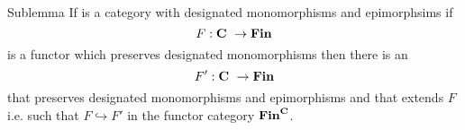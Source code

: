 \newcommand{\mappedrepresentationdiagram}{
\newcommand{\myspacing}{0.25cm}
$
\begin{array}{ c p{0.2cm} c p{0.5cm} c}
\Rnode{Imgf}{Img(D(f))} && \Rnode{b}{D(b)}   &&                   \\[\myspacing]
                        &&                   &&\Rnode{d1}{D(d_1)} \\[\myspacing]
                        &&\Rnode{b1}{D(b_1)} &&                   \\[\myspacing]
                        &&                   &&\Rnode{d2}{D(d_2)} \\[\myspacing]
                        &&\Rnode{b2}{D(b_2)} &&                   \\ %
                        &&\vdots             &&\vdots             \\
                        &&\Rnode{bnp}{d(b_{n-1})} &&           \\[\myspacing]
                        &&                   &&\Rnode{dn}{D(d_n)} \\[\myspacing]
\Rnode{c}{D(c)}  
\end{array}
\begin{arrows}
\ncline{H->}{Imgf}{b}
\ncarr{Imgf}{c}\alabel{H_D}
\ncarr[5]{b}{d1}\alabel{D(q_1)^{-1}}[0.5][-3]
\ncarr{d1}{b1}\blabel{D(h_1)}[0.5][-1]
\ncarr{b1}{d2}\alabel{D(q_2)^{-1}}[0.5][-3]
\ncarr{d2}{b2}\blabel{D(h_2)}[0.5][-1]
\ncarr{bnp}{dn}\alabel{D(q_n)^{-1}}[0.5][-3]
\ncarr[5]{dn}{c}\alabel{D(h_n)}[0.5][-1]
\end{arrows}
$
}

\begin{frame}{Sublemma}
If \catcw is a category with designated monomorphisms and epimorphsims 
if 
 $$F: \textbf{C}\  \rightarrow \textbf{Fin}$$
  is a functor which preserves designated monomorphisms
then there is an 
$$F':\textbf{C}\  \rightarrow \textbf{Fin}$$
that preserves designated monomorphisms and epimorphisms
and that extends $F$ i.e. such that $F \hookrightarrow F'$ in the functor category $\textbf{Fin}^{\textbf{C}}$.
\end{frame}

